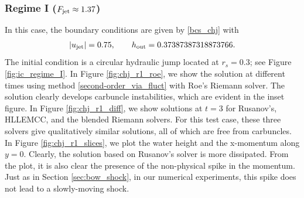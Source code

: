 \documentclass[preprint, 11pt]{article}
\newcommand{\out}{\textup{out}}
\newcommand{\jet}{{\textup{jet}}}
\newcommand{\bfu}{{u}}
\begin{document}
\subsubsection{Regime I ($F_\jet\approx1.37$)}\label{sec:regime_i}
In this case, the boundary conditions are given by \eqref{bcs_chj} with
\begin{align}\label{bcs_chj_r1}
  |\bfu_\jet|=0.75, \qquad h_\out=0.37387387318873766. 
\end{align}
The initial condition is a circular hydraulic jump located at $r_s=0.3$; see Figure \ref{fig:ic_regime_I}. 
In Figure \ref{fig:chj_r1_roe}, we show the solution at different times using
method \eqref{second-order_via_fluct} with Roe's Riemann solver.
The solution clearly develops carbuncle instabilities, which are evident in the inset figure.
In Figure \ref{fig:chj_r1_diff}, we show solutions at $t=3$ for
Rusanov's, HLLEMCC, and the blended Riemann solvers.
For this test case, these three solvers give qualitatively similar solutions,
all of which are free from carbuncles.
In Figure \ref{fig:chj_r1_slices}, we plot the water height and the x-momentum along $y=0$.
Clearly, the solution based on Rusanov's solver is more dissipated. From the plot, it is also clear the presence
of the non-physical spike in the momentum. Just as in Section \ref{sec:bow_shock}, in our numerical experiments,
this spike does not lead to a slowly-moving shock.
\end{document}
